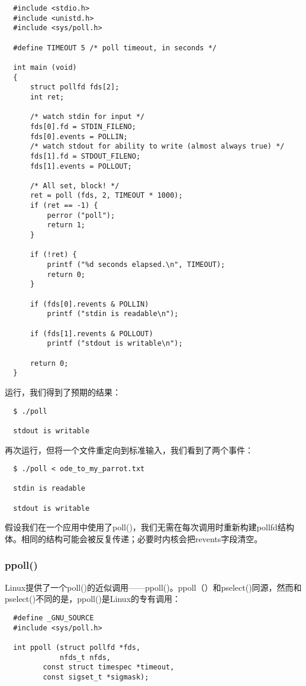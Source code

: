 \begin{lstlisting}
  #include <stdio.h>
  #include <unistd.h>
  #include <sys/poll.h>

  #define TIMEOUT 5 /* poll timeout, in seconds */

  int main (void)
  {
      struct pollfd fds[2];
      int ret;

      /* watch stdin for input */
      fds[0].fd = STDIN_FILENO;
      fds[0].events = POLLIN;
      /* watch stdout for ability to write (almost always true) */
      fds[1].fd = STDOUT_FILENO;
      fds[1].events = POLLOUT;

      /* All set, block! */
      ret = poll (fds, 2, TIMEOUT * 1000);
      if (ret == -1) {
          perror ("poll");
          return 1;
      }

      if (!ret) {
          printf ("%d seconds elapsed.\n", TIMEOUT);
          return 0;
      }

      if (fds[0].revents & POLLIN)
          printf ("stdin is readable\n");

      if (fds[1].revents & POLLOUT)
          printf ("stdout is writable\n");

      return 0;
  }
\end{lstlisting}

运行，我们得到了预期的结果：

\begin{verbatim}
  $ ./poll

  stdout is writable
\end{verbatim}

再次运行，但将一个文件重定向到标准输入，我们看到了两个事件：

\begin{verbatim}
  $ ./poll < ode_to_my_parrot.txt

  stdin is readable

  stdout is writable
\end{verbatim}

假设我们在一个应用中使用了poll()，我们无需在每次调用时重新构建pollfd结构体。相同的结构可能会被反复传递；必要时内核会把revents字段清空。 

\subsubsection{ppoll()}

Linux提供了一个poll()的近似调用——ppoll()。ppoll（）和pselect()同源，然而和pselect()不同的是，ppoll()是Linux的专有调用：

\begin{lstlisting}
  #define _GNU_SOURCE
  #include <sys/poll.h>

  int ppoll (struct pollfd *fds,
             nfds_t nfds,
	     const struct timespec *timeout,
	     const sigset_t *sigmask);
\end{lstlisting}

